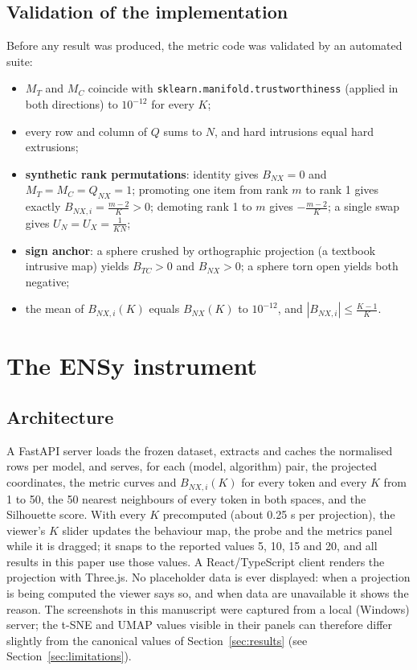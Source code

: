 \documentclass[conference,a4paper]{IEEEtran}
\providecommand{\tightlist}{\setlength{\itemsep}{0pt}\setlength{\parskip}{0pt}}
\begin{document}
\subsection{Validation of the implementation}\label{sec:validation-implementation}

Before any result was produced, the metric code was validated by an
automated suite:

\begin{itemize}
\tightlist
\item
  \(M_T\) and \(M_C\) coincide with
  \texttt{sklearn.manifold.trustworthiness} \cite{r22} (applied in both
  directions) to \(10^{-12}\) for every \(K\);
\item
  every row and column of \(Q\) sums to \(N\), and hard intrusions equal
  hard extrusions;
\item
  \textbf{synthetic rank permutations}: identity gives \(B_{NX}=0\) and
  \(M_T=M_C=Q_{NX}=1\); promoting one item from rank \(m\) to rank 1
  gives exactly \(B_{NX,i} = \frac{m-2}{K} > 0\); demoting rank 1 to
  \(m\) gives \(-\frac{m-2}{K}\); a single swap gives
  \(U_N = U_X = \frac{1}{KN}\);
\item
  \textbf{sign anchor}: a sphere crushed by orthographic projection (a
  textbook intrusive map) yields \(B_{TC} > 0\) and \(B_{NX} > 0\); a
  sphere torn open yields both negative;
\item
  the mean of \(B_{NX,i}(K)\) equals \(B_{NX}(K)\) to \(10^{-12}\), and
  \(|B_{NX,i}| \le \frac{K-1}{K}\).
\end{itemize}

\section{The ENSy instrument}\label{sec:ensy-instrument}

\subsection{Architecture}\label{sec:architecture}

A FastAPI server loads the frozen dataset, extracts and caches the
normalised rows per model, and serves, for each (model, algorithm) pair,
the projected coordinates, the metric curves and \(B_{NX,i}(K)\) for
every token and every \(K\) from 1 to 50, the 50 nearest neighbours of
every token in both spaces, and the Silhouette score. With every \(K\)
precomputed (about 0.25 s per projection), the viewer's \(K\) slider
updates the behaviour map, the probe and the metrics panel while it is
dragged; it snaps to the reported values 5, 10, 15 and 20, and all
results in this paper use those values. A React/TypeScript client renders
the projection with Three.js. No placeholder data is ever displayed:
when a projection is being computed the viewer says so, and when data
are unavailable it shows the reason. The screenshots in this manuscript
were captured from a local (Windows) server; the t-SNE and UMAP values
visible in their panels can therefore differ slightly from the canonical
values of Section~\ref{sec:results} (see Section~\ref{sec:limitations}).
\end{document}
